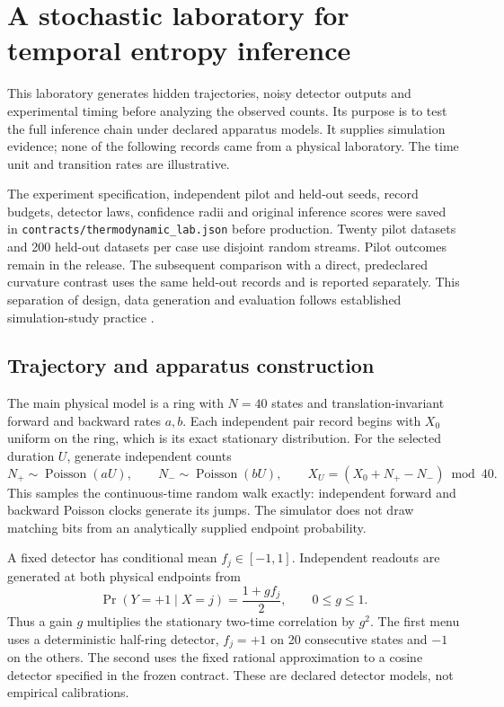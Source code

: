 \chapter{A stochastic laboratory for temporal entropy inference}
\label{ch:vl-thermodynamic}

This laboratory generates hidden trajectories, noisy detector outputs and
experimental timing before analyzing the observed counts. Its purpose is to
test the full inference chain under declared apparatus models. It supplies
simulation evidence; none of the following records came from a physical
laboratory. The time unit and transition rates are illustrative.

The experiment specification, independent pilot and held-out seeds,
record budgets, detector laws, confidence radii and original inference
scores were saved in \texttt{contracts/thermodynamic\_lab.json} before
production. Twenty pilot datasets and 200 held-out datasets per case use
disjoint random streams. Pilot outcomes remain in the release. The
subsequent comparison with a direct, predeclared curvature contrast uses
the same held-out records and is reported separately. This separation of
design, data generation and evaluation follows established simulation-study
practice \cite{vlMorris2019}.

\section{Trajectory and apparatus construction}

The main physical model is a ring with $N=40$ states and translation-invariant
forward and backward rates $a,b$. Each independent pair record begins with
$X_0$ uniform on the ring, which is its exact stationary distribution. For
the selected duration $U$, generate independent counts
\begin{equation}
 N_+\sim\operatorname{Poisson}(aU),\qquad
 N_-\sim\operatorname{Poisson}(bU),\qquad
 X_U=(X_0+N_+-N_-)\bmod40.
\end{equation}
This samples the continuous-time random walk exactly: independent forward
and backward Poisson clocks generate its jumps. The simulator does not draw
matching bits from an analytically supplied endpoint probability.

A fixed detector has conditional mean $f_j\in[-1,1]$. Independent readouts
are generated at both physical endpoints from
\[
 \Pr(Y=+1\mid X=j)=\frac{1+g f_j}{2},\qquad 0\le g\le1.
\]
Thus a gain $g$ multiplies the stationary two-time correlation by $g^2$.
The first menu uses a deterministic half-ring detector, $f_j=+1$ on 20
consecutive states and $-1$ on the others. The second uses the fixed rational
approximation to a cosine detector specified in the frozen contract.
These are declared detector models, not empirical calibrations.

